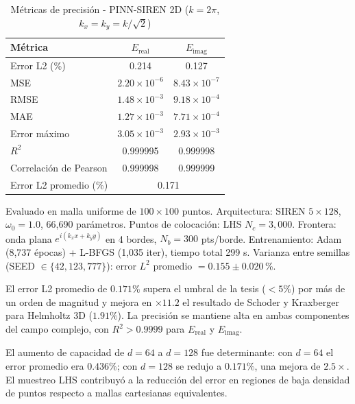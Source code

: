 \begin{table}[htbp]
\centering
\begin{threeparttable}
\caption{Métricas de precisión - PINN-SIREN 2D ($k = 2\pi$, $k_x = k_y = k/\sqrt{2}$)}
\label{tab:resultados2d}
\begin{tabular}{lcc}
\toprule
Métrica & $E_{\mathrm{real}}$ & $E_{\mathrm{imag}}$ \\
\midrule
Error L2 (\%)          & 0.214 & 0.127 \\
MSE                    & $2.20 \times 10^{-6}$ & $8.43 \times 10^{-7}$ \\
RMSE                   & $1.48 \times 10^{-3}$ & $9.18 \times 10^{-4}$ \\
MAE                    & $1.27 \times 10^{-3}$ & $7.71 \times 10^{-4}$ \\
Error máximo           & $3.05 \times 10^{-3}$ & $2.93 \times 10^{-3}$ \\
$R^2$                  & 0.999995 & 0.999998 \\
Correlación de Pearson & 0.999998 & 0.999999 \\
\midrule
Error L2 promedio (\%) & \multicolumn{2}{c}{0.171} \\
\bottomrule
\end{tabular}
\begin{tablenotes}
\small
\item Evaluado en malla uniforme de $100 \times 100$ puntos.
      Arquitectura: SIREN $5 \times 128$, $\omega_0 = 1.0$, 66{,}690 parámetros.
      Puntos de colocación: LHS $N_c = 3{,}000$.
      Frontera: onda plana $e^{i(k_x x + k_y y)}$ en 4 bordes, $N_b = 300$ pts/borde.
      Entrenamiento: Adam (8{,}737 épocas) + L-BFGS (1{,}035 iter), tiempo total 299 s.
      Varianza entre semillas (SEED $\in \{42, 123, 777\}$):
      error $L^2$ promedio $= 0.155 \pm 0.020$\,\%.
\end{tablenotes}
\end{threeparttable}
\end{table}

El error L2 promedio de $0.171\%$ supera el umbral de la tesis ($< 5\%$) por más de un
orden de magnitud y mejora en $\times 11.2$ el resultado de
Schoder y Kraxberger~\cite{Schoder2024_PINN_acoustics} para Helmholtz 3D ($1.91\%$).
La precisión se mantiene alta en ambas componentes del campo complejo, con $R^2 > 0.9999$
para $E_{\mathrm{real}}$ y $E_{\mathrm{imag}}$.

El aumento de capacidad de $d = 64$ a $d = 128$ fue determinante: con $d = 64$ el error
promedio era $0.436\%$; con $d = 128$ se redujo a $0.171\%$, una mejora de $2.5\times$.
El muestreo LHS contribuyó a la reducción del error en regiones de baja densidad de
puntos respecto a mallas cartesianas equivalentes.

